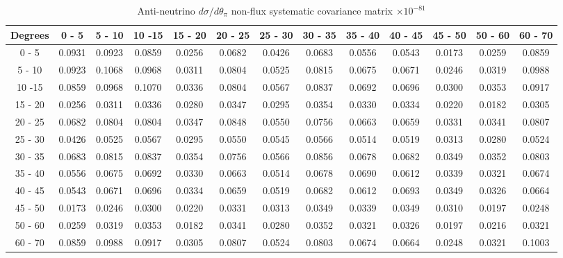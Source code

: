 \documentclass[aps,prl,twocolumn,showpacs,superscriptaddress,nofootinbib]{revtex4}
\begin{document}
\begingroup
\squeezetable
\begin{table}[h]
\tabcolsep=0.11cm
\begin{tabular}{c|cccccccccccc}
Degrees & 0 - 5 & 5 - 10 & 10 -15 & 15 - 20 & 20 - 25 & 25 - 30 & 30 - 35 & 35 - 40 & 40 - 45 & 45 - 50 & 50 - 60 & 60 - 70 \\
\hline
 0 - 5&0.0931 & 0.0923 & 0.0859 & 0.0256 & 0.0682 & 0.0426 & 0.0683 & 0.0556 & 0.0543 & 0.0173 & 0.0259 & 0.0859 \\ 
 5 - 10&0.0923 & 0.1068 & 0.0968 & 0.0311 & 0.0804 & 0.0525 & 0.0815 & 0.0675 & 0.0671 & 0.0246 & 0.0319 & 0.0988 \\
10 -15 &0.0859 & 0.0968 & 0.1070 & 0.0336 & 0.0804 & 0.0567 & 0.0837 & 0.0692 & 0.0696 & 0.0300 & 0.0353 & 0.0917  \\
15 - 20 &0.0256 & 0.0311 & 0.0336 & 0.0280 & 0.0347 & 0.0295 & 0.0354 & 0.0330 & 0.0334 & 0.0220 & 0.0182 & 0.0305  \\
20 - 25 &0.0682 & 0.0804 & 0.0804 & 0.0347 & 0.0848 & 0.0550 & 0.0756 & 0.0663 & 0.0659 & 0.0331 & 0.0341 & 0.0807  \\
25 - 30 &0.0426 & 0.0525 & 0.0567 & 0.0295 & 0.0550 & 0.0545 & 0.0566 & 0.0514 & 0.0519 & 0.0313 & 0.0280 & 0.0524  \\
30 - 35 &0.0683 & 0.0815 & 0.0837 & 0.0354 & 0.0756 & 0.0566 & 0.0856 & 0.0678 & 0.0682 & 0.0349 & 0.0352 & 0.0803  \\
35 - 40 &0.0556 & 0.0675 & 0.0692 & 0.0330 & 0.0663 & 0.0514 & 0.0678 & 0.0690 & 0.0612 & 0.0339 & 0.0321 & 0.0674  \\
40 - 45 &0.0543 & 0.0671 & 0.0696 & 0.0334 & 0.0659 & 0.0519 & 0.0682 & 0.0612 & 0.0693 & 0.0349 & 0.0326 & 0.0664  \\
45 - 50 &0.0173 & 0.0246 & 0.0300 & 0.0220 & 0.0331 & 0.0313 & 0.0349 & 0.0339 & 0.0349 & 0.0310 & 0.0197 & 0.0248  \\
50 - 60 &0.0259 & 0.0319 & 0.0353 & 0.0182 & 0.0341 & 0.0280 & 0.0352 & 0.0321 & 0.0326 & 0.0197 & 0.0216 & 0.0321  \\
60 - 70 &0.0859 & 0.0988 & 0.0917 & 0.0305 & 0.0807 & 0.0524 & 0.0803 & 0.0674 & 0.0664 & 0.0248 & 0.0321 & 0.1003  \\
\end{tabular}
\caption{Anti-neutrino $d\sigma/d\theta_\pi$ non-flux systematic covariance matrix  $\times 10^{-81}$ }
\label{tab:thpiB-nonflux}
\end{table}
\endgroup
\end{document}

